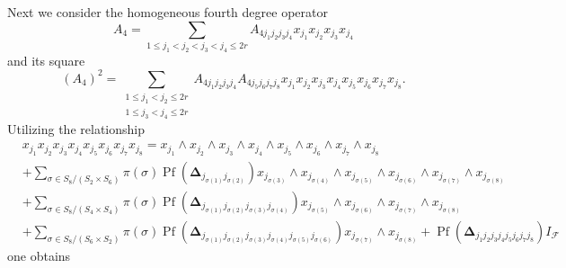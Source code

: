 \documentclass[aps, preprint]{revtex4}
\begin{document}
Next we consider the homogeneous fourth degree operator
\begin{equation}A_{4} =\sum _{1 \leq j_{1} <j_{2} <j_{3} <j_{4} \leq 2 r}A_{4 j_{1} j_{2} j_{3} j_{4}} x_{j_{1}} x_{j_{2}} x_{j_{3}} x_{j_{4}}
\end{equation}and its square
\begin{equation}\left (A_{4}\right )^{2} =\sum _{\begin{array}{c}1 \leq j_{1} <j_{2} \leq 2 r \\
1 \leq j_{3} <j_{4} \leq 2 r\end{array}}A_{4 j_{1} j_{2} j_{3} j_{4}} A_{4 j_{5} j_{6} j_{7} j_{8}} x_{j_{1}} x_{j_{2}} x_{j_{3}} x_{j_{4}} x_{j_{5}} x_{j_{6}} x_{j_{7}} x_{j_{8}}\text{.}
\end{equation}Utilizing the relationship
\begin{align} & x_{j_{1}} x_{j_{2}} x_{j_{3}} x_{j_{4}} x_{j_{5}} x_{j_{6}} x_{j_{7}} x_{j_{8}} =x_{j_{1}} \wedge x_{j_{2}} \wedge x_{j_{3}} \wedge x_{j_{4}} \wedge x_{j_{5}} \wedge x_{j_{6}} \wedge x_{j_{7}} \wedge x_{j_{8}} \nonumber  \\
 &  +\sum _{\sigma  \in S_{8}/\left (S_{2} \times S_{6}\right )}\pi  \left (\sigma \right ) \ensuremath{\operatorname*{Pf}} \left (\mathbf{\Delta }_{j_{\sigma  \left (1\right )} j_{\sigma  \left (2\right )}}\right ) x_{j_{\sigma  \left (3\right )}} \wedge x_{j_{\sigma  \left (4\right )}} \wedge x_{j_{\sigma  \left (5\right )}} \wedge x_{j_{\sigma  \left (6\right )}} \wedge x_{j_{\sigma  \left (7\right )}} \wedge x_{j_{\sigma  \left (8\right )}} \nonumber  \\
 &  +\sum _{\sigma  \in S_{8}/\left (S_{4} \times S_{4}\right )}\pi  \left (\sigma \right ) \ensuremath{\operatorname*{Pf}} \left (\mathbf{\Delta }_{j_{\sigma  \left (1\right )} j_{\sigma  \left (2\right )} j_{\sigma  \left (3\right )} j_{\sigma  \left (4\right )}}\right ) x_{j_{\sigma  \left (5\right )}} \wedge x_{j_{\sigma  \left (6\right )}} \wedge x_{j_{\sigma  \left (7\right )}} \wedge x_{j_{\sigma  \left (8\right )}} \nonumber  \\
 &  +\sum _{\sigma  \in S_{8}/\left (S_{6} \times S_{2}\right )}\pi  \left (\sigma \right ) \ensuremath{\operatorname*{Pf}} \left (\mathbf{\Delta }_{j_{\sigma  \left (1\right )} j_{\sigma  \left (2\right )} j_{\sigma  \left (3\right )} j_{\sigma  \left (4\right )} j_{\sigma  \left (5\right )} j_{\sigma  \left (6\right )}}\right ) x_{j_{\sigma  \left (7\right )}} \wedge x_{j_{\sigma  \left (8\right )}} +\ensuremath{\operatorname*{Pf}} \left (\mathbf{\Delta }_{j_{1} j_{2} j_{3} j_{4} j_{5} j_{6} j_{7} j_{8}}\right ) I_{\mathcal{F}}\end{align}one obtains
\end{document}
